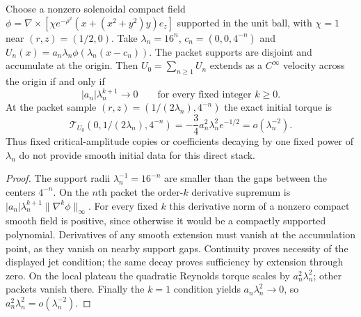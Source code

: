 \begin{theorem}
\label{thm:xxxviii-packets}
Choose a nonzero solenoidal compact field
$\phi=\nabla\times[\chi e^{-\rho^2}(x+(x^2+y^2)y)e_z]$
supported in the unit ball, with $\chi=1$
near $(r,z)=(1/2,0)$. Take
$\lambda_n=16^n$, $c_n=(0,0,4^{-n})$ and
$U_n(x)=a_n\lambda_n\phi(\lambda_n(x-c_n))$.
The packet supports are disjoint and accumulate at the origin.
Then $U_0=\sum_{n\ge1}U_n$ extends as a
$C^\infty$ velocity across the origin if and only if
\begin{equation}\label{eq:xxxviii-smoothness}
\boxed{\quad
|a_n|\lambda_n^{k+1}\to0
\qquad\text{for every fixed integer }k\ge0.\quad}
\end{equation}
At the packet sample $(r,z)=(1/(2\lambda_n),4^{-n})$
the exact initial torque is
\begin{equation}\label{eq:xxxviii-stack-torque}
\boxed{\quad
\mathcal T_{U_0}(0,1/(2\lambda_n),4^{-n})
=-\frac34 a_n^2\lambda_n^2e^{-1/2}
=o(\lambda_n^{-2}).\quad}
\end{equation}
Thus fixed critical-amplitude copies or coefficients
decaying by one fixed power of $\lambda_n$ do
not provide smooth initial data for this direct stack.
\end{theorem}
\begin{proof}
The support radii $\lambda_n^{-1}=16^{-n}$
are smaller than the gaps between the centers $4^{-n}$.
On the $n$th packet the order-$k$ derivative supremum is
$|a_n|\lambda_n^{k+1}\|\nabla^k\phi\|_\infty$.
For every fixed $k$ this derivative norm of a nonzero
compact smooth field is positive, since otherwise it
would be a compactly supported polynomial.
Derivatives of any smooth extension must vanish at the
accumulation point, as they vanish on nearby support gaps.
Continuity proves necessity of the displayed jet condition;
the same decay proves sufficiency by extension through zero.
On the local plateau the quadratic Reynolds torque
scales by $a_n^2\lambda_n^2$; other packets vanish there.
Finally the $k=1$ condition yields
$a_n\lambda_n^2\to0$, so
$a_n^2\lambda_n^2=o(\lambda_n^{-2})$.
\end{proof}


